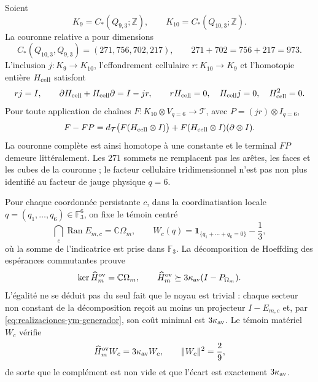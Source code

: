 Soient
\[
 K_9=C_*(Q_{9,3};\mathbb Z),\qquad
 K_{10}=C_*(Q_{10,3};\mathbb Z).
\]
La couronne relative a pour dimensions
\[
 C_*(Q_{10,3},Q_{9,3})=(271,756,702,217),
 \qquad 271+702=756+217=973.
\]
L’inclusion \(j:K_9\to K_{10}\), l’effondrement cellulaire
\(r:K_{10}\to K_9\) et l’homotopie entière \(H_{\rm cell}\) satisfont
\begin{equation}\label{eq:realizaciones-ym-sdr-corona}
 rj=I,\qquad
 \partial H_{\rm cell}+H_{\rm cell}\partial=I-jr,\qquad
 rH_{\rm cell}=0,\quad H_{\rm cell}j=0,\quad H_{\rm cell}^2=0.
\end{equation}
Pour toute application de chaînes
\(F:K_{10}\otimes V_{q=6}\to\mathcal T\), avec
\(P=(jr)\otimes I_{q=6}\),
\begin{equation}\label{eq:realizaciones-ym-homotopia-terminal}
 F-FP
 =d_{\mathcal T}\bigl(F(H_{\rm cell}\otimes I)\bigr)
  +F(H_{\rm cell}\otimes I)(\partial\otimes I).
\end{equation}
La couronne complète est ainsi homotope à une constante et le terminal \(FP\) demeure littéralement. Les \(271\) sommets ne remplacent pas les arêtes, les faces et les cubes de la couronne ; le facteur cellulaire tridimensionnel n'est pas non plus identifié au facteur de jauge physique \(q=6\).

Pour chaque coordonnée persistante \(c\), dans la coordinatisation locale \(q=(q_1,\ldots,q_6)\in\mathbb F_3^6\), on fixe le témoin centré
\begin{equation}\label{eq:realizaciones-ym-testigo-definicion}
 \bigcap_c\operatorname{Ran}E_{m,c}=\mathbb C\Omega_m,
 \qquad
 W_c(q)=\mathbf 1_{\{q_1+\cdots+q_6=0\}}-\frac13,
\end{equation}
où la somme de l’indicatrice est prise dans \(\mathbb F_3\). La décomposition de
Hoeffding des espérances commutantes prouve
\begin{equation}\label{eq:realizaciones-ym-gap-finito}
 \ker\widehat H_m^{\rm ov}=\mathbb C\Omega_m,
 \qquad
 \widehat H_m^{\rm ov}\succeq
 3\kappa_{\rm av}(I-P_{\Omega_m}).
\end{equation}
L’égalité ne se déduit pas du seul fait que le noyau est trivial : chaque secteur non
constant de la décomposition reçoit au moins un projecteur
\(I-E_{m,c}\) et, par \eqref{eq:realizaciones-ym-generador}, son coût minimal
est \(3\kappa_{\rm av}\). Le témoin matériel \(W_c\) vérifie
\begin{equation}\label{eq:realizaciones-ym-testigo-gap}
 \widehat H_m^{\rm ov}W_c=3\kappa_{\rm av}W_c,
 \qquad \|W_c\|^2=\frac29,
\end{equation}
de sorte que le complément est non vide et que l’écart est exactement
\(3\kappa_{\rm av}\).

